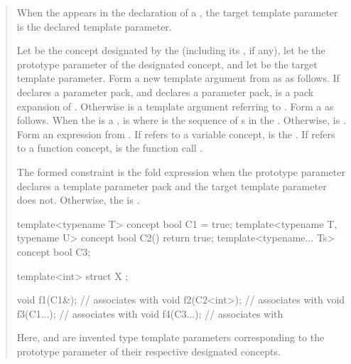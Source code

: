 \begin{quote}
When the 
appears in the declaration of a 
,
the target template parameter is the declared template parameter.


\pnum
Let  be the concept designated by the
 (including its 
, if any),
let  be the prototype parameter of the designated
concept, and let  be the target template parameter.
% 
Form a new template argument  from  as
as follows. If  declares a parameter pack, and
 declares a parameter pack, 
is a pack expansion of . Otherwise  is
a template argument referring to .
% 
Form a  
as follows. 
% 
When the  is a 
,  is 
 where  is the sequence of 
s in the
.
% 
Otherwise,  is .
% 
Form an expression  from . If  refers to a 
variable concept,  is the  .
% 
If  refers to a function concept,  is the function call 
.

\pnum
The formed constraint is the fold expression 
when the prototype parameter  declares a template parameter pack and 
the target template parameter  does not.
% 
Otherwise, the  is .


\enterexample
\begin{codeblock}
template<typename T> concept bool C1 = true;
template<typename T, typename U> concept bool C2() { return true; }
template<typename... Ts> concept bool C3;

template<int> struct X { };

void f1(C1&);     // associates  with 
void f2(C2<int>); // associates  with 
void f3(C1...);   // associates  with 
void f4(C3...);   // associates  with 
\end{codeblock}
% 
Here,  and  are invented type template parameters 
corresponding to the prototype parameter of their respective designated 
concepts.

\end{quote}
